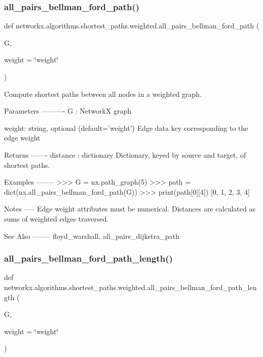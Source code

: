 \subsubsection{\texorpdfstring{all\+\_\+pairs\+\_\+bellman\+\_\+ford\+\_\+path()}{all\_pairs\_bellman\_ford\_path()}}
{\footnotesize\ttfamily def networkx.\+algorithms.\+shortest\+\_\+paths.\+weighted.\+all\+\_\+pairs\+\_\+bellman\+\_\+ford\+\_\+path (\begin{DoxyParamCaption}\item[{}]{G,  }\item[{}]{weight = {\ttfamily \char`\"{}weight\char`\"{}} }\end{DoxyParamCaption})}

\begin{DoxyVerb}Compute shortest paths between all nodes in a weighted graph.

Parameters
----------
G : NetworkX graph

weight: string, optional (default='weight')
    Edge data key corresponding to the edge weight

Returns
-------
distance : dictionary
    Dictionary, keyed by source and target, of shortest paths.

Examples
--------
>>> G = nx.path_graph(5)
>>> path = dict(nx.all_pairs_bellman_ford_path(G))
>>> print(path[0][4])
[0, 1, 2, 3, 4]

Notes
-----
Edge weight attributes must be numerical.
Distances are calculated as sums of weighted edges traversed.

See Also
--------
floyd_warshall, all_pairs_dijkstra_path\end{DoxyVerb}
 \mbox{\label{namespacenetworkx_1_1algorithms_1_1shortest__paths_1_1weighted_a936c1f63a5a5699a63900f569a9cc9b0}} 
\subsubsection{\texorpdfstring{all\+\_\+pairs\+\_\+bellman\+\_\+ford\+\_\+path\+\_\+length()}{all\_pairs\_bellman\_ford\_path\_length()}}
{\footnotesize\ttfamily def networkx.\+algorithms.\+shortest\+\_\+paths.\+weighted.\+all\+\_\+pairs\+\_\+bellman\+\_\+ford\+\_\+path\+\_\+length (\begin{DoxyParamCaption}\item[{}]{G,  }\item[{}]{weight = {\ttfamily \char`\"{}weight\char`\"{}} }\end{DoxyParamCaption})}

